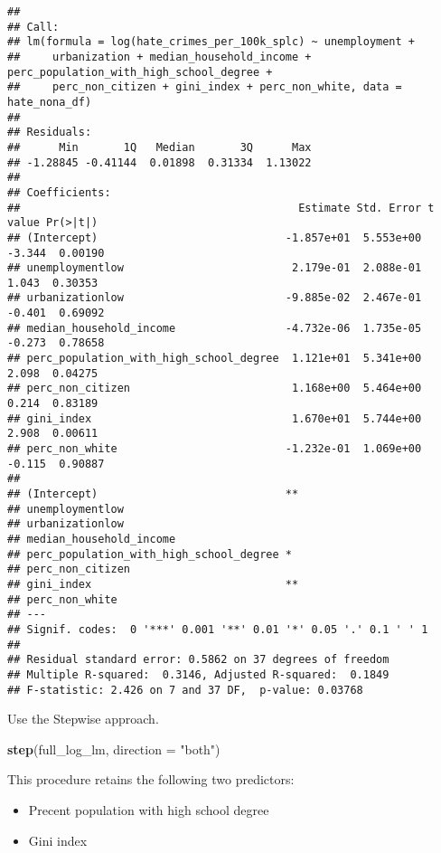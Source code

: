 \documentclass[
]{article}
\newenvironment{Shaded}{\begin{snugshade}}{\end{snugshade}}
\newcommand{\DataTypeTok}[1]{\textcolor[rgb]{0.13,0.29,0.53}{#1}}
\newcommand{\KeywordTok}[1]{\textcolor[rgb]{0.13,0.29,0.53}{\textbf{#1}}}
\newcommand{\NormalTok}[1]{#1}
\newcommand{\StringTok}[1]{\textcolor[rgb]{0.31,0.60,0.02}{#1}}
\begin{document}
\begin{verbatim}
## 
## Call:
## lm(formula = log(hate_crimes_per_100k_splc) ~ unemployment + 
##     urbanization + median_household_income + perc_population_with_high_school_degree + 
##     perc_non_citizen + gini_index + perc_non_white, data = hate_nona_df)
## 
## Residuals:
##      Min       1Q   Median       3Q      Max 
## -1.28845 -0.41144  0.01898  0.31334  1.13022 
## 
## Coefficients:
##                                           Estimate Std. Error t value Pr(>|t|)
## (Intercept)                             -1.857e+01  5.553e+00  -3.344  0.00190
## unemploymentlow                          2.179e-01  2.088e-01   1.043  0.30353
## urbanizationlow                         -9.885e-02  2.467e-01  -0.401  0.69092
## median_household_income                 -4.732e-06  1.735e-05  -0.273  0.78658
## perc_population_with_high_school_degree  1.121e+01  5.341e+00   2.098  0.04275
## perc_non_citizen                         1.168e+00  5.464e+00   0.214  0.83189
## gini_index                               1.670e+01  5.744e+00   2.908  0.00611
## perc_non_white                          -1.232e-01  1.069e+00  -0.115  0.90887
##                                           
## (Intercept)                             **
## unemploymentlow                           
## urbanizationlow                           
## median_household_income                   
## perc_population_with_high_school_degree * 
## perc_non_citizen                          
## gini_index                              **
## perc_non_white                            
## ---
## Signif. codes:  0 '***' 0.001 '**' 0.01 '*' 0.05 '.' 0.1 ' ' 1
## 
## Residual standard error: 0.5862 on 37 degrees of freedom
## Multiple R-squared:  0.3146, Adjusted R-squared:  0.1849 
## F-statistic: 2.426 on 7 and 37 DF,  p-value: 0.03768
\end{verbatim}

Use the Stepwise approach.

\begin{Shaded}
\begin{Highlighting}[]
\KeywordTok{step}\NormalTok{(full_log_lm, }\DataTypeTok{direction =} \StringTok{"both"}\NormalTok{)}
\end{Highlighting}
\end{Shaded}

This procedure retains the following two predictors:

\begin{itemize}
\item
  Precent population with high school degree
\item
  Gini index
\end{itemize}
\end{document}
